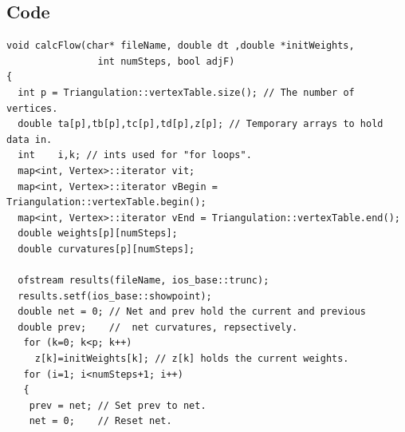 \documentclass[12pt]{article}
\begin{document}
\subsection*{Code}
\begin{verbatim}void calcFlow(char* fileName, double dt ,double *initWeights,
				int numSteps, bool adjF)  
{
  int p = Triangulation::vertexTable.size(); // The number of vertices.
  double ta[p],tb[p],tc[p],td[p],z[p]; // Temporary arrays to hold data in.
  int    i,k; // ints used for "for loops".
  map<int, Vertex>::iterator vit;
  map<int, Vertex>::iterator vBegin = Triangulation::vertexTable.begin();
  map<int, Vertex>::iterator vEnd = Triangulation::vertexTable.end();
  double weights[p][numSteps];
  double curvatures[p][numSteps];
  
  ofstream results(fileName, ios_base::trunc);
  results.setf(ios_base::showpoint);
  double net = 0; // Net and prev hold the current and previous
  double prev;    //  net curvatures, repsectively.
   for (k=0; k<p; k++)
     z[k]=initWeights[k]; // z[k] holds the current weights.
   for (i=1; i<numSteps+1; i++) 
   {
    prev = net; // Set prev to net.
    net = 0;    // Reset net.
    

\end{verbatim}
\end{document}

